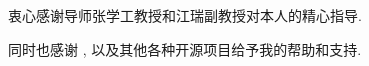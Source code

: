 ﻿%

\begin{ack}
	衷心感谢导师张学工教授和江瑞副教授对本人的精心指导. 
	
	同时也感谢 \href{https://github.com/xueruini/thuthesis}{\thuthesis}, 
	以及其他各种开源项目给予我的帮助和支持. 
\end{ack}
